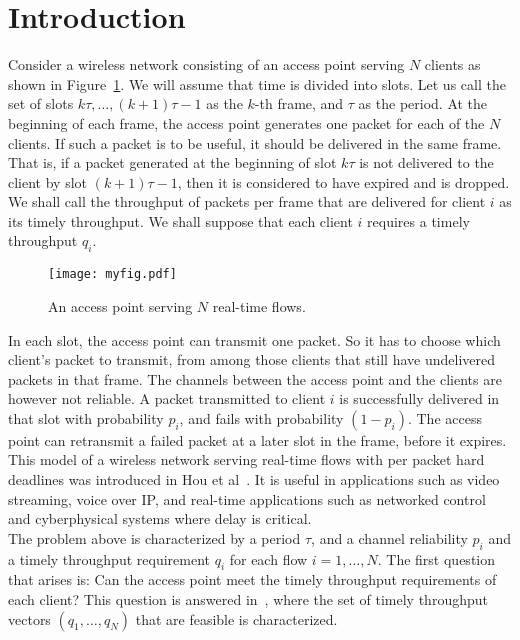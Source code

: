 \documentclass[letterpaper, 10 pt, conference]{ieeeconf}
\begin{document}
\section{Introduction}\label{sec1}
Consider a wireless network consisting of an access point serving $N$ clients as shown in Figure~\ref{fig1}. We will assume that time is divided into slots. Let us call the set of slots $k\tau,\ldots,\left(k+1\right)\tau-1$ as the $k$-th frame, and $\tau$ as the period. At the beginning of each frame, the access point generates one packet for each of the $N$ clients. If such a packet is to be useful, it should be
delivered in the same frame. That is, if a packet generated at the beginning of slot $k\tau$ is not delivered to the client by slot $\left(k+1\right)\tau-1$, then it is considered to have expired and is dropped. 
We shall call the throughput of packets per frame that are delivered for client $i$ as its timely throughput. We shall suppose that each client $i$ requires a timely throughput $q_{i}$.
\begin{figure}[b]
\texttt{[image: myfig.pdf]}
\caption{An access point serving $N$ real-time flows.}
\label{fig1}
\end{figure}
In each slot, the access point can transmit one packet. So it has to choose which client's packet to transmit, from among those clients that still have undelivered packets in that frame. The channels between the access point and the clients are however not reliable. A packet transmitted to client $i$ is successfully delivered in that slot with probability $p_{i}$, and fails with probability $\left(1-p_{i}\right)$. The access point can retransmit a failed packet at a later slot in the frame, before it expires.\\
This model of a wireless network serving real-time flows with per packet hard deadlines was introduced in Hou et al~\cite{c3}. It is useful in applications such as video streaming, voice over IP, and  real-time applications such as networked control and cyberphysical systems where delay is critical.\\
The problem above is characterized by a period $\tau$, and a channel reliability $p_{i}$ and a timely throughput requirement $q_{i}$ for each flow $i=1,\ldots,N$. The first question that arises is: Can the access point meet the timely throughput requirements of each client? This question is answered in~\cite{c3}, where the set of timely throughput vectors $\left(q_{1},\ldots,q_{N}\right)$ that are feasible is characterized.\\
\end{document}
